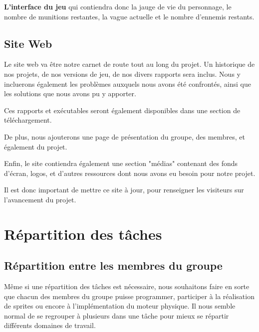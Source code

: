\documentclass{article}
\begin{document}
\par
\textbf{L'interface du jeu} qui contiendra donc la jauge de vie du personnage, le nombre de munitions restantes, la vague actuelle et le nombre d'ennemis restants.
\newline



\newpage
\subsection{Site Web}

\par
Le site web va être notre carnet de route tout au long du projet. Un historique de nos projets, de nos versions de jeu, de nos divers rapports sera inclus. Nous y incluerons également les problèmes auxquels nous avons été confrontés, ainsi que les solutions que nous avons pu y apporter.
\newline

\par
Ces rapports et exécutables seront également disponibles dans une section de téléchargement.
\newline

\par
De plus, nous ajouterons une page de présentation du groupe, des membres, et également du projet.
\newline

\par
Enfin, le site contiendra également une section "médias" contenant des fonds d'écran, logos, et d'autres ressources dont nous avons eu besoin pour notre projet.
\newline

\par
Il est donc important de mettre ce site à jour, pour renseigner les visiteurs sur l'avancement du projet.
\newline



\newpage
\section{Répartition des tâches}
\subsection{Répartition entre les membres du groupe}

\par
Même si une répartition des tâches est nécessaire, nous souhaitons faire en sorte que chacun des membres du groupe puisse programmer, participer à la réalisation de sprites ou encore à l'implémentation du moteur physique. Il nous semble normal de se regrouper à plusieurs dans une tâche pour mieux se répartir différents domaines de travail.
\newline
\end{document}
